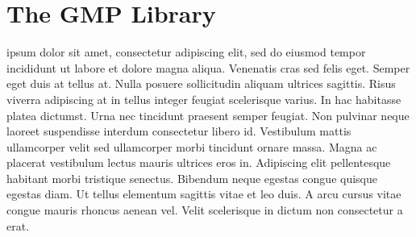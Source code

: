 \documentclass[12pt]{article}
\begin{document}

\tableofcontents
\newpage



\section{The GMP Library}
	 ipsum dolor sit amet, consectetur adipiscing elit, sed do eiusmod tempor incididunt ut labore et dolore magna aliqua. Venenatis cras sed felis eget. Semper eget duis at tellus at. Nulla posuere sollicitudin aliquam ultrices sagittis. Risus viverra adipiscing at in tellus integer feugiat scelerisque varius. In hac habitasse platea dictumst. Urna nec tincidunt praesent semper feugiat. Non pulvinar neque laoreet suspendisse interdum consectetur libero id. Vestibulum mattis ullamcorper velit sed ullamcorper morbi tincidunt ornare massa. Magna ac placerat vestibulum lectus mauris ultrices eros in. Adipiscing elit pellentesque habitant morbi tristique senectus. Bibendum neque egestas congue quisque egestas diam. Ut tellus elementum sagittis vitae et leo duis. A arcu cursus vitae congue mauris rhoncus aenean vel. Velit scelerisque in dictum non consectetur a erat.\par
\end{document}
